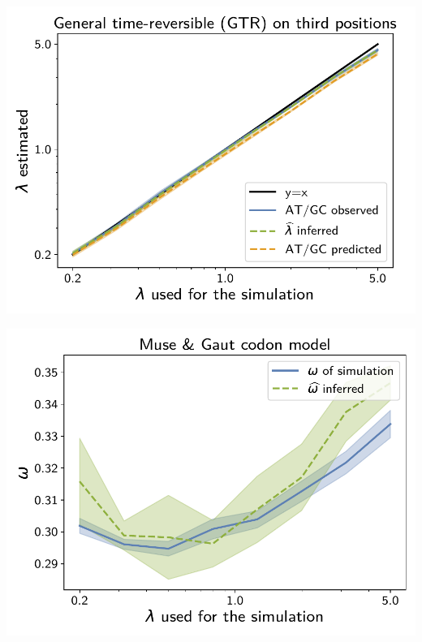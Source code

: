 \documentclass{article}
\begin{document}
\begin{center}
\begin{minipage}{0.325\linewidth}
    \end{minipage}
    \hfill
    \begin{minipage}{0.325\linewidth}
        \includegraphics[width=\linewidth, page=1]{inference_supp_mat/PrimatesExons10Mu0.5_lambda_GTR.pdf}
    \end{minipage}
    \hfill
    \begin{minipage}{0.325\linewidth}
        \includegraphics[width=\linewidth, page=1]{inference_supp_mat/PrimatesExons10Mu0.5_omega_MG.pdf}
    \end{minipage}

\end{center}
\end{document}
